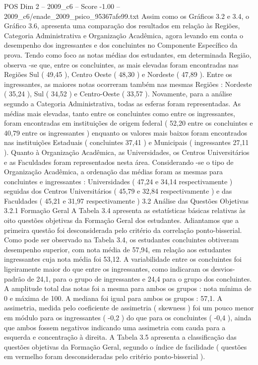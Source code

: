 \begin{textsample}{POS Dim 2 – 2009\_c6 – Score -1.00 – 2009\_c6/enade\_2009\_psico\_95367afe99.txt}
Assim como os Gráficos 3.2 e 3.4, o Gráfico 3.6, apresenta uma comparação dos resultados em relação às Regiões, Categoria Administrativa e Organização Acadêmica, agora levando em conta o desempenho dos ingressantes e dos concluintes no Componente Específico da prova.
Tendo como foco as notas médias dos estudantes, em determinada Região, observa -se que, entre os concluintes, as mais elevadas foram encontradas nas Regiões Sul ( 49,45 ), Centro Oeste ( 48,30 ) e Nordeste ( 47,89 ).
Entre os ingressantes, as maiores notas ocorreram também nas mesmas Regiões : Nordeste ( 35,24 ), Sul ( 34,52 ) e Centro-Oeste ( 33,57 ).
Novamente, para a análise segundo a Categoria Administrativa, todas as esferas foram representadas.
As médias mais elevadas, tanto entre os concluintes como entre os ingressantes, foram encontradas em instituições de origem federal ( 52,20 entre os concluintes e 40,79 entre os ingressantes ) enquanto os valores mais baixos foram encontrados nas instituições Estaduais ( concluintes 37,41 ) e Municipais ( ingressantes 27,11 ).
Quanto à Organização Acadêmica, as Universidades, os Centros Universitários e as Faculdades foram representados nesta área.
Considerando -se o tipo de Organização Acadêmica, a ordenação das médias foram as mesmas para concluintes e ingressantes : Universidades ( 47,24 e 34,14 respectivamente ) seguidas dos Centros Universitários ( 45,79 e 32,84 respectivamente ) e das Faculdades ( 45,21 e 31,97 respectivamente ) 3.2 Análise das Questões Objetivas 3.2.1 Formação Geral A Tabela 3.4 apresenta as estatísticas básicas relativas às oito questões objetivas da Formação Geral dos estudantes.
Adiantamos que a primeira questão foi desconsiderada pelo critério da correlação ponto-bisserial.
Como pode ser observado na Tabela 3.4, os estudantes concluintes obtiveram desempenho superior, com nota média de 57,94, em relação aos estudantes ingressantes cuja nota média foi 53,12.
A variabilidade entre os concluintes foi ligeiramente maior do que entre os ingressantes, como indicaram os desvios-padrão de 24,1, para o grupo de ingressantes e 24,4 para o grupo dos concluintes.
A amplitude total das notas foi a mesma para ambos os grupos : nota mínima de 0 e máxima de 100.
A mediana foi igual para ambos os grupos : 57,1.
A assimetria, medida pelo coeficiente de assimetria ( skewness ) foi um pouco menor em módulo para os ingressantes ( -0,2 ) do que para os concluintes ( -0,4 ), ainda que ambos fossem negativos indicando uma assimetria com cauda para a esquerda e concentração à direita.
A Tabela 3.5 apresenta a classificação das questões objetivas da Formação Geral, segundo o índice de facilidade ( questões em vermelho foram desconsideradas pelo critério ponto-bisserial ).

\end{textsample}
